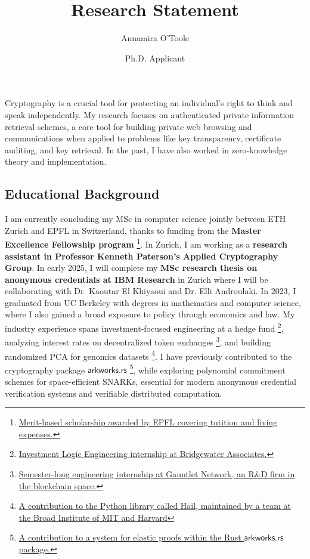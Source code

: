 \documentclass{article}
\title{Research Statement}
\author{Annamira O'Toole}
\date{Ph.D. Applicant}
\newcommand{\code}[1]{\mathsf{#1}}
\newcommand{\aftersep}{\vspace{-0.3cm}}
\newcommand{\beforesep}{\vspace{-0.2cm}}
\begin{document}
\maketitle%
%
Cryptography is a crucial tool for protecting an individual’s right to think and speak independently. My research focuses on authenticated private information retrieval schemes, a core tool for building private web browsing and communications when applied to problems like key transparency, certificate auditing, and key retrieval. In the past, I have also worked in zero-knowledge theory and implementation. \\

\aftersep
\subsection*{Educational Background}
\beforesep

I am currently concluding my MSc in computer science jointly between ETH Zurich and EPFL in Switzerland, thanks to funding from the \textbf{Master Excellence Fellowship program} \footnote{\href{https://www.epfl.ch/education/master/master-excellence-fellowships/}{Merit-based scholarship awarded by EPFL covering tutition and living expenses.}}. In Zurich, I am working as a \textbf{research assistant in Professor Kenneth Paterson’s Applied Cryptography Group}. In early 2025, I will complete my \textbf{MSc research thesis on anonymous credentials at IBM Research} in Zurich where I will be collaborating with Dr. Kaoutar El Khiyaoui and Dr. Elli Androulaki. In 2023, I graduated from UC Berkeley with degrees in mathematics and computer science, where I also gained a broad exposure to policy through economics and law. My industry experience spans investment-focused engineering at a hedge fund \footnote{\href{www.bridgewater.com/}{Investment Logic Engineering internship at Bridgewater Associates.}}, analyzing interest rates on decentralized token exchanges \footnote{\href{https://www.gauntlet.xyz/}{Semester-long engineering internship at Gauntlet Network, an R\&D firm in the blockchain space.}}, and building randomized PCA for genomics datasets \footnote{\href{https://hail.is/}{A contribution to the Python library called Hail, maintained by a team at the Broad Institute of MIT and Harvard}}. I have previously contributed to the cryptography package $\code{arkworks.rs}$ \footnote{\href{https://github.com/arkworks-rs}{A contribution to a system for elastic proofs within the Rust $\code{arkworks.rs}$ package.}}, while exploring polynomial commitment schemes for space-efficient SNARKs, essential for modern anonymous credential verification systems and verifiable distributed computation. 
\end{document}
